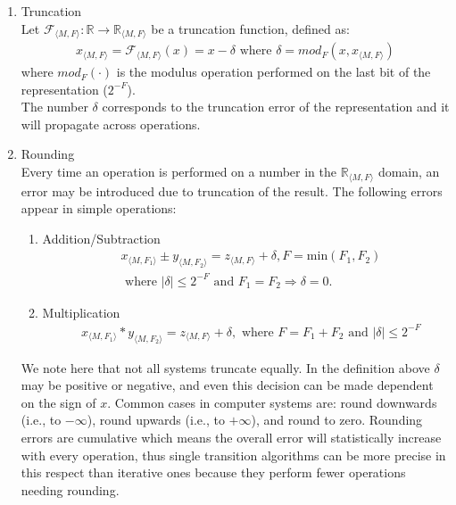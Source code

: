 \documentclass[a4paper,UKenglish]{lipics-v2018}
\begin{document}
\begin{enumerate}
\item Truncation\\
Let $\mathcal{F}_{\langle M,F \rangle} : \mathbb{R} \rightarrow \mathbb{R}_{\langle M,F \rangle}$
be a truncation function, defined as:
\begin{align*}
x_{\langle M,F \rangle}=\mathcal{F}_{\langle M,F \rangle}(x) = x-\delta \text{ where } \delta=mod_F(x, x_{\langle M,F \rangle})
\end{align*} 
where $mod_F(\cdot)$ is the modulus operation performed on the last bit of the representation ($2^{-F}$).\\
The number $\delta$ corresponds to the truncation error of the representation and it will propagate across operations.
\item Rounding\\
Every time an operation is performed on a number in the $\mathbb{R}_{\langle M,F \rangle}$ domain, an error may be
introduced due to truncation of the result. 
The following errors appear in simple operations:
\begin{enumerate}
\item Addition/Subtraction
\begin{align*}
&x_{\langle M,F_1\rangle} \pm y_{\langle M,F_2\rangle}=z_{\langle M,F\rangle} + \delta,  F=\text{min}(F_1,F_2)\\
&\text{ where } |\delta| \leq 2^{-F} \text{ and } F_1=F_2 \Rightarrow \delta=0.
\end{align*}
\item Multiplication
\begin{align*}
&x_{\langle M,F_1\rangle} * y_{\langle M,F_2\rangle}=z_{\langle M,F\rangle} + \delta, \text{ where } F=F_1+F_2 \text{ and } |\delta| \leq 2^{-F}
\end{align*}
\end{enumerate}
%
We note here that not all systems truncate equally.  In the definition above
$\delta$ may be positive or negative, and even this decision can be made
dependent on the sign of $x$.  Common cases in computer systems are: round
downwards (i.e., to $-\infty$), round upwards (i.e., to $+\infty$), and
round to zero.  Rounding errors are cumulative which means the overall error
will statistically increase with every operation, thus single transition
algorithms can be more precise in this respect than iterative ones because
they perform fewer operations needing rounding.


\end{enumerate}
\end{document}
